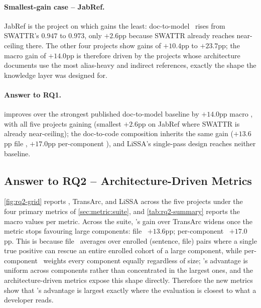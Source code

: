 \paragraph{Smallest-gain case -- JabRef.}
JabRef is the project on which \approach{} gains the least: doc-to-model \fone\ rises from SWATTR's $0.947$ to $0.973$, only $+2.6$pp because SWATTR already reaches near-ceiling there.
The other four projects show gains of $+10.4$pp to $+23.7$pp; the macro gain of $+14.0$pp is therefore driven by the projects whose architecture documents use the most alias-heavy and indirect references, exactly the shape the knowledge layer was designed for.

\begin{rqanswer}
\paragraph{Answer to RQ1.}
\approach{} improves over the strongest published doc-to-model baseline by $+14.0$pp macro \fone, with all five projects gaining (smallest $+2.6$pp on JabRef where SWATTR is already near-ceiling); the doc-to-code composition inherits the same gain ($+13.6$pp file \fone, $+17.0$pp per-component \fone), and LiSSA's single-pass design reaches neither baseline.
\end{rqanswer}

\subsection{Answer to RQ2 -- Architecture-Driven Metrics}
\label{sec:results:rq2}




\autoref{fig:rq2-grid} reports \approach{}, TransArc, and LiSSA across the five projects under the four primary metrics of \autoref{sec:metric:suite}, and \autoref{tab:rq2-summary} reports the macro values per metric.
Across the suite, \approach{}'s gain over TransArc widens once the metric stops favouring large components: file \fone\ $+13.6$pp; per-component \fone\ $+17.0$pp.
This is because file \fone\ averages over enrolled (sentence, file) pairs where a single true positive can rescue an entire enrolled cohort of a large component, while per-component \fone\ weights every component equally regardless of size; \approach{}'s advantage is uniform across components rather than concentrated in the largest ones, and the architecture-driven metrics expose this shape directly.
Therefore the new metrics show that \approach{}'s advantage is largest exactly where the evaluation is closest to what a developer reads.

